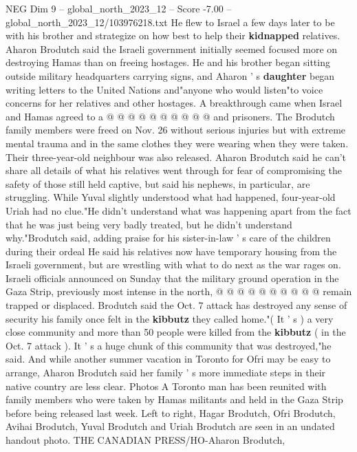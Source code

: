 \begin{textsample}{NEG Dim 9 – global\_north\_2023\_12 – Score -7.00 – global\_north\_2023\_12/103976218.txt}
He flew to Israel a few days later to be with his brother and strategize on how best to help their \textbf{kidnapped} relatives.
Aharon Brodutch said the Israeli government initially seemed focused more on destroying Hamas than on freeing hostages.
He and his brother began sitting outside military headquarters carrying signs, and Aharon ' s \textbf{daughter} began writing letters to the United Nations and"anyone who would listen"to voice concerns for her relatives and other hostages.
A breakthrough came when Israel and Hamas agreed to a @ @ @ @ @ @ @ @ @ @ and prisoners.
The Brodutch family members were freed on Nov. 26 without serious injuries but with extreme mental trauma and in the same clothes they were wearing when they were taken.
Their three-year-old neighbour was also released.
Aharon Brodutch said he can't share all details of what his relatives went through for fear of compromising the safety of those still held captive, but said his nephews, in particular, are struggling.
While Yuval slightly understood what had happened, four-year-old Uriah had no clue."He didn't understand what was happening apart from the fact that he was just being very badly treated, but he didn't understand why."Brodutch said, adding praise for his sister-in-law ' s care of the children during their ordeal He said his relatives now have temporary housing from the Israeli government, but are wrestling with what to do next as the war rages on.
Israeli officials announced on Sunday that the military ground operation in the Gaza Strip, previously most intense in the north, @ @ @ @ @ @ @ @ @ @ remain trapped or displaced.
Brodutch said the Oct. 7 attack has destroyed any sense of security his family once felt in the \textbf{kibbutz} they called home."( It ' s ) a very close community and more than 50 people were killed from the \textbf{kibbutz} ( in the Oct. 7 attack ).
It ' s a huge chunk of this community that was destroyed,"he said.
And while another summer vacation in Toronto for Ofri may be easy to arrange, Aharon Brodutch said her family ' s more immediate steps in their native country are less clear.
Photos A Toronto man has been reunited with family members who were taken by Hamas militants and held in the Gaza Strip before being released last week.
Left to right, Hagar Brodutch, Ofri Brodutch, Avihai Brodutch, Yuval Brodutch and Uriah Brodutch are seen in an undated handout photo.
THE CANADIAN PRESS/HO-Aharon Brodutch,

\end{textsample}
